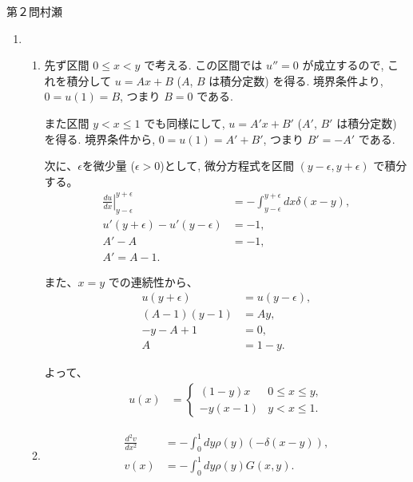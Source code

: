 \begin{answer}{第２問}{村瀬}
\begin{enumerate}
\item
  \begin{enumerate}
  \item
    先ず区間 $0\le x<y$ で考える.
    この区間では $u'' = 0$ が成立するので, これを積分して
    $u = Ax + B$ ($A$, $B$ は積分定数) を得る.
    境界条件より, $0=u(1)=B$, つまり $B=0$ である.

    また区間 $y< x \le 1$ でも同様にして,
    $u = A'x +B'$ ($A'$, $B'$ は積分定数) を得る.
    境界条件から, $0=u(1)=A'+B'$, つまり $B'=-A'$ である.

    次に、$\epsilon$を微少量 ($\epsilon>0$)として,
    微分方程式を区間 $(y-\epsilon, y+\epsilon)$ で積分する。
    \begin{align*}
      \left.\frac{du}{dx}\right|_{y-\epsilon}^{y+\epsilon}
        &= -\int_{y-\epsilon}^{y+\epsilon} dx\delta(x-y),\\
      u'(y+\epsilon) - u'(y-\epsilon) &= -1,\\
      A' - A &= -1,\\
      A' = A - 1.
    \end{align*}

    また、$x=y$ での連続性から、
    \begin{align*}
      u(y+\epsilon) &= u(y-\epsilon),\\
      (A-1)(y-1) &= A y,\\
      -y -A +1 &= 0,\\
      A &=1-y.
    \end{align*}

    よって、
    \begin{align*}
      u(x) &= \begin{cases}
        (1-y) x   & 0 \le x \le y,\\
        -y (x -1) & y < x \le 1.
      \end{cases}
    \end{align*}

  \item
    \begin{align*}
      \frac{d^2v}{dx^2} &= -\int_0^1 dy \rho(y)(-\delta(x-y)),\\
      v(x) &= - \int_0^1 dy \rho(y)G(x,y).\\
    \end{align*}
  \end{enumerate}


\end{enumerate}
\end{answer}
